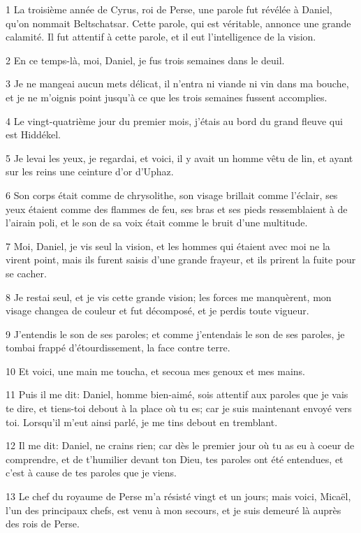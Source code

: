 \par 1 La troisième année de Cyrus, roi de Perse, une parole fut révélée à Daniel, qu'on nommait Beltschatsar. Cette parole, qui est véritable, annonce une grande calamité. Il fut attentif à cette parole, et il eut l'intelligence de la vision.
\par 2 En ce temps-là, moi, Daniel, je fus trois semaines dans le deuil.
\par 3 Je ne mangeai aucun mets délicat, il n'entra ni viande ni vin dans ma bouche, et je ne m'oignis point jusqu'à ce que les trois semaines fussent accomplies.
\par 4 Le vingt-quatrième jour du premier mois, j'étais au bord du grand fleuve qui est Hiddékel.
\par 5 Je levai les yeux, je regardai, et voici, il y avait un homme vêtu de lin, et ayant sur les reins une ceinture d'or d'Uphaz.
\par 6 Son corps était comme de chrysolithe, son visage brillait comme l'éclair, ses yeux étaient comme des flammes de feu, ses bras et ses pieds ressemblaient à de l'airain poli, et le son de sa voix était comme le bruit d'une multitude.
\par 7 Moi, Daniel, je vis seul la vision, et les hommes qui étaient avec moi ne la virent point, mais ils furent saisis d'une grande frayeur, et ils prirent la fuite pour se cacher.
\par 8 Je restai seul, et je vis cette grande vision; les forces me manquèrent, mon visage changea de couleur et fut décomposé, et je perdis toute vigueur.
\par 9 J'entendis le son de ses paroles; et comme j'entendais le son de ses paroles, je tombai frappé d'étourdissement, la face contre terre.
\par 10 Et voici, une main me toucha, et secoua mes genoux et mes mains.
\par 11 Puis il me dit: Daniel, homme bien-aimé, sois attentif aux paroles que je vais te dire, et tiens-toi debout à la place où tu es; car je suis maintenant envoyé vers toi. Lorsqu'il m'eut ainsi parlé, je me tins debout en tremblant.
\par 12 Il me dit: Daniel, ne crains rien; car dès le premier jour où tu as eu à coeur de comprendre, et de t'humilier devant ton Dieu, tes paroles ont été entendues, et c'est à cause de tes paroles que je viens.
\par 13 Le chef du royaume de Perse m'a résisté vingt et un jours; mais voici, Micaël, l'un des principaux chefs, est venu à mon secours, et je suis demeuré là auprès des rois de Perse.
